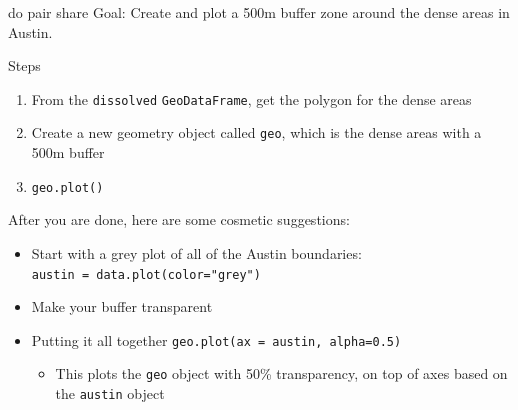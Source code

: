 \documentclass[
  ignorenonframetext,
]{beamer}
\providecommand{\tightlist}{%
  \setlength{\itemsep}{0pt}\setlength{\parskip}{0pt}}\usepackage{longtable,booktabs,array}
\begin{document}
\begin{frame}[fragile]{do pair share}
\label{do-pair-share}
Goal: Create and plot a 500m buffer zone around the dense areas in
Austin.

Steps

\begin{enumerate}
\tightlist
\item
  From the \texttt{dissolved} \texttt{GeoDataFrame}, get the polygon for
  the dense areas
\item
  Create a new geometry object called \texttt{geo}, which is the dense
  areas with a 500m buffer
\item
  \texttt{geo.plot()}
\end{enumerate}

After you are done, here are some cosmetic suggestions:

\begin{itemize}
\tightlist
\item
  Start with a grey plot of all of the Austin boundaries:
  \texttt{austin\ =\ data.plot(color="grey")}
\item
  Make your buffer transparent
\item
  Putting it all together \texttt{geo.plot(ax\ =\ austin,\ alpha=0.5)}

  \begin{itemize}
  \tightlist
  \item
    This plots the \texttt{geo} object with 50\% transparency, on top of
    axes based on the \texttt{austin} object
  \end{itemize}
\end{itemize}
\end{frame}
\end{document}
